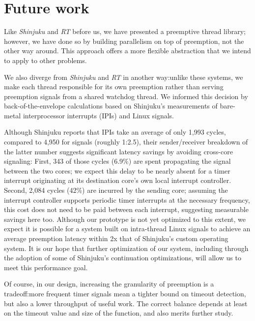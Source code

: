 \section{Future work}



Like \textit{Shinjuku} and \textit{RT} before us, we have presented a preemptive
thread library; however, we have done so by building parallelism on top of
preemption,
not the other way around.  This approach offers a more flexible abstraction that
we intend to apply to other problems.


We also diverge from \textit{Shinjuku} and \textit{RT}
in another way:\@ unlike these systems, we make each thread responsible for
its own preemption rather than serving preemption signals from a shared watchdog
thread.  We informed this decision by back-of-the-envelope calculations based on
Shinjuku's measurements of bare-metal interprocessor
interrupts (IPIs) and Linux signals.

Although Shinjuku reports that IPIs take an average of only 1,993 cycles, compared to
4,950 for signals (roughly 1:2.5), their sender/receiver breakdown of the latter
number suggests significant latency savings by avoiding cross-core signaling:
First, 343 of those cycles (6.9\%) are spent propagating the signal between the two
cores; we expect this delay to be nearly absent for a timer interrupt originating at
its destination core's own local interrupt controller.  Second, 2,084 cycles (42\%)
are incurred by the sending core; assuming the interrupt controller supports
periodic timer interrupts at the necessary frequency, this cost does not need to be
paid between each interrupt, suggesting measurable savings here too.  Although
our prototype is not yet optimized to this extent, we expect it is possible for a
system built on intra-thread Linux signals to achieve an average preemption latency
within 2x that of Shinjuku's custom operating system.  It is our hope that further
optimization of our system, including through the adoption of some of Shinjuku's
continuation optimizations, will allow us to meet this performance goal.

Of course, in our design, increasing the granularity of preemption is a tradeoff:\@ more
frequent timer signals mean a tighter bound on timeout detection, but also a lower
throughput of useful work.  The correct balance depends at least on the
timeout value and size of the function, and also merits further study.


